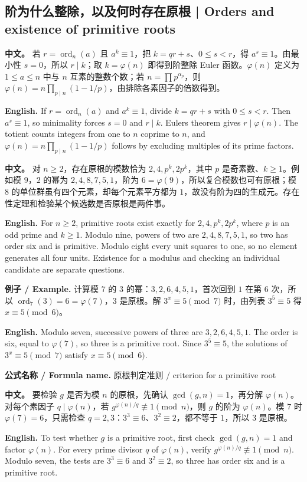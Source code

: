 \documentclass[UTF8,11pt,a4paper]{ctexart}
\newcommand{\EN}[1]{\par\noindent \textbf{English.} #1\par}
\newcommand{\BOTH}[2]{\par\noindent\textbf{中文。} #1\par\noindent\textbf{English.} #2\par}
\newcommand{\FORMULA}[2]{\par\noindent\textbf{公式名称 / Formula name.} #1 / #2\par}
\newcommand{\EX}[2]{\par\noindent \textbf{例子 / Example.} #1\par\EN{#2}}
\newcommand{\APS}[2]{\par\noindent\textbf{中文。} #1\par\noindent\textbf{English.} #2\par\smallskip}
\begin{document}
\subsection{阶为什么整除，以及何时存在原根 | Orders and existence of primitive roots}
\APS{若 $r=\operatorname{ord}_n(a)$ 且 $a^k\equiv1$，把 $k=qr+s$、$0\le s<r$，得 $a^s\equiv1$。由最小性 $s=0$，所以 $r\mid k$；取 $k=\varphi(n)$ 即得到阶整除 Euler 函数。$\varphi(n)$ 定义为 $1\le a\le n$ 中与 $n$ 互素的整数个数；若 $n=\prod p^{\alpha_p}$，则 $\varphi(n)=n\prod_{p\mid n}(1-1/p)$，由排除各素因子的倍数得到。}{If $r=\operatorname{ord}_n(a)$ and $a^k\equiv1$, divide $k=qr+s$ with $0\le s<r$. Then $a^s\equiv1$, so minimality forces $s=0$ and $r\mid k$. Euler\textquotesingle s theorem gives $r\mid\varphi(n)$. The totient counts integers from one to $n$ coprime to $n$, and $\varphi(n)=n\prod_{p\mid n}(1-1/p)$ follows by excluding multiples of its prime factors.}
\APS{对 $n\ge2$，存在原根的模数恰为 $2,4,p^k,2p^k$，其中 $p$ 是奇素数、$k\ge1$。例如模 $9$，$2$ 的幂为 $2,4,8,7,5,1$，阶为 $6=\varphi(9)$，所以复合模数也可有原根；模 $8$ 的单位群虽有四个元素，却每个元素平方都为 $1$，故没有阶为四的生成元。存在性定理和检验某个候选数是否原根是两件事。}{For $n\ge2$, primitive roots exist exactly for $2,4,p^k,2p^k$, where $p$ is an odd prime and $k\ge1$. Modulo nine, powers of two are $2,4,8,7,5,1$, so two has order six and is primitive. Modulo eight every unit squares to one, so no element generates all four units. Existence for a modulus and checking an individual candidate are separate questions.}


\EX{计算模 $7$ 的 $3$ 的幂：$3,2,6,4,5,1$，首次回到 $1$ 在第 $6$ 次，所以 $\operatorname{ord}_7(3)=6=\varphi(7)$，$3$ 是原根。解 $3^x\equiv5\pmod7$ 时，由列表 $3^5\equiv5$ 得 $x\equiv5\pmod6$。}{Modulo seven, successive powers of three are $3,2,6,4,5,1$. The order is six, equal to $\varphi(7)$, so three is a primitive root. Since $3^5\equiv5$, the solutions of $3^x\equiv5\pmod7$ satisfy $x\equiv5\pmod6$.}
\FORMULA{原根判定准则}{criterion for a primitive root}
\BOTH{要检验 $g$ 是否为模 $n$ 的原根，先确认 $\gcd(g,n)=1$，再分解 $\varphi(n)$。对每个素因子 $q\mid\varphi(n)$，若 $g^{\varphi(n)/q}\not\equiv1\pmod n$，则 $g$ 的阶为 $\varphi(n)$。模 $7$ 时 $\varphi(7)=6$，只需检查 $q=2,3$：$3^3\equiv6$、$3^2\equiv2$，都不等于 $1$，所以 $3$ 是原根。}{To test whether $g$ is a primitive root, first check $\gcd(g,n)=1$ and factor $\varphi(n)$. For every prime divisor $q$ of $\varphi(n)$, verify $g^{\varphi(n)/q}\not\equiv1\pmod n$. Modulo seven, the tests are $3^3\equiv6$ and $3^2\equiv2$, so three has order six and is a primitive root.}
\end{document}
